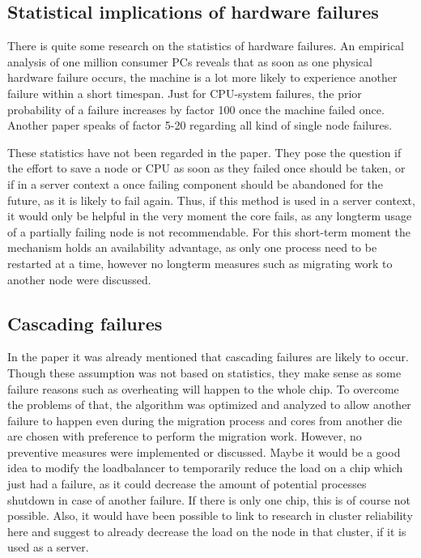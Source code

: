 \documentclass[a4paper,10pt,twoside]{article}
\begin{document}
\subsection{Statistical implications of hardware failures}
There is quite some research on the statistics of hardware failures. An empirical analysis of one million consumer PCs \cite{Microsoftfailures} reveals that as soon as one physical hardware failure occurs, the machine is a lot more likely to experience another failure within a short timespan. Just for CPU-system failures, the prior probability of a failure increases by factor 100 once the machine failed once. Another paper \cite{HPCfailures} speaks of factor 5-20 regarding all kind of single node failures. 

These statistics have not been regarded in the paper. They pose the question if the effort to save a node or CPU as soon as they failed once should be taken, or if in a server context a once failing component should be abandoned for the future, as it is likely to fail again. Thus, if this method is used in a server context, it would only be helpful in the very moment the core fails, as any longterm usage of a partially failing node is not recommendable. For this short-term moment the mechanism holds an availability advantage, as only one process need to be restarted at a time, however no longterm measures such as migrating work to another node \cite{VMLiveMigration} were discussed. 

\subsection{Cascading failures}
In the paper it was already mentioned that cascading failures are likely to occur. Though these assumption was not based on statistics, they make sense as some failure reasons such as overheating will happen to the whole chip. To overcome the problems of that, the algorithm was optimized and analyzed to allow another failure to happen even during the migration process and cores from another die are chosen with preference to perform the migration work. However, no preventive measures were implemented or discussed. Maybe it would be a good idea to modify the loadbalancer to temporarily reduce the load on a chip which just had a failure, as it could decrease the amount of potential processes shutdown in case of another failure. If there is only one chip, this is of course not possible. Also, it would have been possible to link to research in cluster reliability here and suggest to already decrease the load on the node in that cluster, if it is used as a server.
\end{document}
